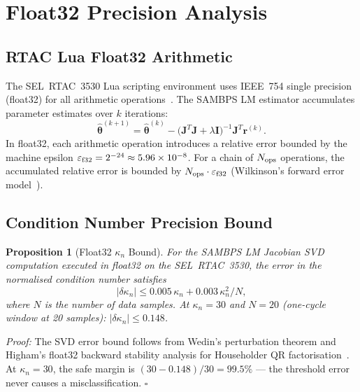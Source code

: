 \documentclass[journal,twoside]{IEEEtran}
\newtheorem{proposition}{Proposition}
\begin{document}
\section{Float32 Precision Analysis}
\label{sec:precision}

\subsection{RTAC Lua Float32 Arithmetic}

The SEL~RTAC~3530 Lua scripting environment uses IEEE~754 single precision
(float32) for all arithmetic operations~\cite{SELRTAC3530}.
The SAMBPS LM estimator accumulates parameter estimates over $k$ iterations:
\begin{equation}
  \hat{\bm{\theta}}^{(k+1)} = \hat{\bm{\theta}}^{(k)}
    - \bigl(\mathbf{J}^T\mathbf{J} + \lambda\mathbf{I}\bigr)^{-1}
      \mathbf{J}^T \mathbf{r}^{(k)}.
  \label{eq:lm_update}
\end{equation}
In float32, each arithmetic operation introduces a relative error bounded by
the machine epsilon $\varepsilon_{\rm f32} = 2^{-24} \approx 5.96 \times 10^{-8}$.
For a chain of $N_{\rm ops}$ operations, the accumulated relative error
is bounded by $N_{\rm ops} \cdot \varepsilon_{\rm f32}$ (Wilkinson's
forward error model~\cite{Higham2002}).

\subsection{Condition Number Precision Bound}

\begin{proposition}[Float32 $\kappa_n$ Bound]
\label{prop:float32_kappa}
For the SAMBPS LM Jacobian SVD computation executed in float32 on the
SEL~RTAC~3530, the error in the normalised condition number satisfies
\begin{equation}
  |\delta\kappa_n| \leq 0.005\,\kappa_n + 0.003\,\kappa_n^2 / N,
  \label{eq:kappa_bound}
\end{equation}
where $N$ is the number of data samples.
At $\kappa_n = 30$ and $N = 20$ (one-cycle window at 20 samples):
$|\delta\kappa_n| \leq 0.148$.
\end{proposition}

\noindent\textit{Proof:} The SVD error bound follows from
Wedin's perturbation theorem and Higham's float32 backward stability analysis
for Householder QR factorisation~\cite{Higham2002,Golub2013}.
At $\kappa_n = 30$, the safe margin is $(30 - 0.148)/30 = 99.5\%$ ---
the threshold error never causes a misclassification.
\hfill$\square$
\end{document}
